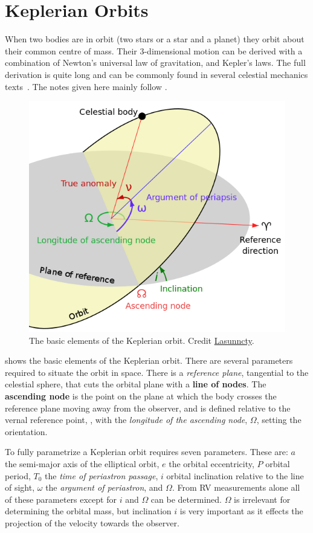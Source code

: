 

\section{Keplerian Orbits}

When two bodies are in orbit (two stars or a star and a planet) they orbit about their common centre of mass. Their 3-dimensional motion can be derived with a combination of Newton's universal law of gravitation, and Kepler's laws.
The full derivation is quite long and can be commonly found in several celestial mechanics texts~\citep[e.g.][]{moulton_introduction_1914, perryman_exoplanet_2011}. The notes given here mainly follow \citep{valiero__2016}. 

\begin{figure}
    \centering
    \includegraphics[width=0.3\linewidth]{figures/advanced_material/orbit}
    \caption{The basic elements of the Keplerian orbit. Credit \href{https://commons.wikimedia.org/w/index.php?curid=8971052}{Lasunncty}.}
    \label{fig:orbit}
\end{figure}

 shows the basic elements of the Keplerian orbit. There are several parameters required to situate the orbit in space. There is a \textit{reference plane}, tangential to the celestial sphere, that cuts the orbital plane with a \textbf{line of nodes}. The \textbf{ascending node} is the point on the plane at which the body crosses the reference plane moving away from the observer, and is defined relative to the vernal reference point, \Aries, with the \textit{longitude of the ascending node}, $\Omega$, setting the orientation. 

To fully parametrize a Keplerian orbit requires seven parameters. These are: $a$ the semi-major axis of the elliptical orbit, $e$ the orbital eccentricity, $P$ orbital period, $T_0$ the \emph{time of periastron passage}, $i$ orbital inclination relative to the line of sight, $\omega$ the \emph{argument of periastron}, and $\Omega$.
From RV measurements alone all of these parameters except for $i$ and $\Omega$ can be determined. $\Omega$ is irrelevant for determining the orbital mass, but inclination $i$ is very important as it effects the projection of the velocity towards the observer.


